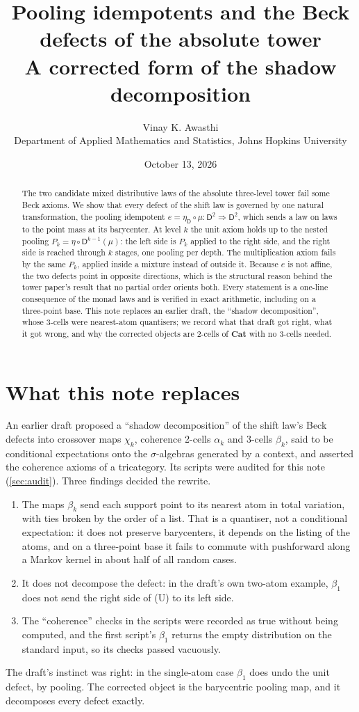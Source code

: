 \documentclass[11pt]{article}
\title{\textbf{Pooling idempotents and the Beck defects of the absolute tower}\\[.3em]
\large A corrected form of the shadow decomposition}
\author{Vinay K. Awasthi\\ Department of Applied Mathematics and Statistics, Johns Hopkins University}
\date{October 13, 2026}
\theoremstyle{definition}
\newcommand{\D}{\mathsf D}
\begin{document}
\maketitle

\begin{abstract}
The two candidate mixed distributive laws of the absolute three-level tower \cite{Tower} fail some Beck axioms. We show that every
defect of the shift law is governed by one natural transformation, the pooling idempotent $e=\eta_{\D}\circ\mu\colon\D^2\Rightarrow\D^2$,
which sends a law on laws to the point mass at its barycenter. At level $k$ the unit axiom holds up to the nested pooling
$P_k=\eta\circ\D^{k-1}(\mu)$: the left side is $P_k$ applied to the right side, and the right side is reached through $k$ stages, one
pooling per depth. The multiplication axiom fails by the same $P_k$, applied inside a mixture instead of outside it. Because $e$ is not
affine, the two defects point in opposite directions, which is the structural reason behind the tower paper's result that no partial
order orients both. Every statement is a one-line consequence of the monad laws and is verified in exact arithmetic, including on a
three-point base. This note replaces an earlier draft, the ``shadow decomposition'', whose 3-cells were nearest-atom quantisers; we
record what that draft got right, what it got wrong, and why the corrected objects are 2-cells of $\mathbf{Cat}$ with no 3-cells needed.
\end{abstract}

\section{What this note replaces}
An earlier draft proposed a ``shadow decomposition'' of the shift law's Beck defects into crossover maps $\chi_k$, coherence 2-cells
$\alpha_k$ and 3-cells $\beta_k$, said to be conditional expectations onto the $\sigma$-algebras generated by a context, and asserted the
coherence axioms of a tricategory. Its scripts were audited for this note (\cref{sec:audit}). Three findings decided the rewrite.
\begin{enumerate}[leftmargin=*,nosep]
\item The maps $\beta_k$ send each support point to its nearest atom in total variation, with ties broken by the order of a list. That is a
  quantiser, not a conditional expectation: it does not preserve barycenters, it depends on the listing of the atoms, and on a three-point
  base it fails to commute with pushforward along a Markov kernel in about half of all random cases.
\item It does not decompose the defect: in the draft's own two-atom example, $\beta_1$ does not send the right side of (U) to its left
  side.
\item The ``coherence'' checks in the scripts were recorded as true without being computed, and the first script's $\beta_1$ returns the
  empty distribution on the standard input, so its checks passed vacuously.
\end{enumerate}
The draft's instinct was right: in the single-atom case $\beta_1$ does undo the unit defect, by pooling. The corrected object is the
barycentric pooling map, and it decomposes every defect exactly.
\end{document}
